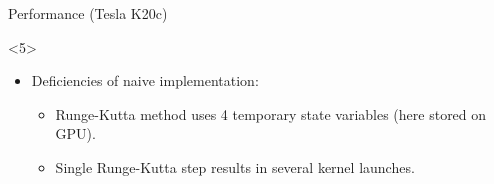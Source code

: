 \documentclass[@BEAMER_OPTIONS@]{beamer}
\begin{document}
\begin{frame}[fragile]{Performance (Tesla K20c)}
\begin{figure}
    \end{figure}
    \begin{uncoverenv}<5>
        \begin{itemize}
            \item Deficiencies of naive implementation:
                \begin{itemize}
                    \item Runge-Kutta method uses 4 temporary state variables
                        (here stored on GPU).
                    \item Single Runge-Kutta step results in several kernel
                        launches.
                \end{itemize}
        \end{itemize}
    \end{uncoverenv}
\end{frame}

\note{ }
\end{document}
